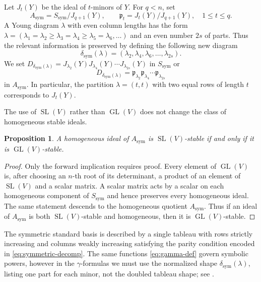 \documentclass[11pt,reqno]{amsart}
\numberwithin{equation}{subsection}
\newtheorem{proposition}[theorem]{Proposition}
\theoremstyle{definition}
\theoremstyle{remark}
\DeclareMathOperator{\GL}{GL}
\DeclareMathOperator{\SL}{SL}
\newcommand{\fp}{\mathfrak p}
\begin{document}
Let $J_t(Y)$ be the ideal of $t$-minors of $Y$.  For $q<n$, set
\begin{equation}\label{eq:symmetric-quotient}
 A_{\mathrm{sym}}=S_{\mathrm{sym}}/J_{q+1}(Y),
 \qquad
 \fp_t=J_t(Y)/J_{q+1}(Y),\quad1\le t\le q.
\end{equation}
A Young diagram $\lambda$ with even column lengths has the form $\lambda=(\lambda_1 = \lambda_2 \geq  \lambda_3= \lambda_4 \geq  \lambda_5= \lambda_6, \ldots)$ and an even number $2s$ of parts. Thus the relevant information is preserved by
defining the following new diagram
\begin{equation}\label{eq:sym-transform}
 \delta_{\mathrm{sym}}(\lambda)
 =(\lambda_2,\lambda_4,
 \lambda_6,\ldots, \lambda_{2s}).
\end{equation}
We set  $D_{\delta_{\mathrm{sym}}(\lambda)}=J_{\lambda_2}(Y)J_{\lambda_4}(Y)\cdots J_{\lambda_{2s}}(Y)$ in $S_{\mathrm{sym}}$ or 
\[
D_{\delta_{\mathrm{sym}}(\lambda)}=\fp_{\lambda_2}\fp_{\lambda_4}\cdots \fp_{\lambda_{2s}}
\] in $A_{\mathrm{sym}}$. 
In particular, the partition $\lambda=(t, t)$ with two equal rows of length $t$ corresponds to $J_t(Y)$.

The use of $\SL(V)$ rather than $\GL(V)$ does not change the class of
homogeneous stable ideals.

\begin{proposition}\label{prop:sl-gl}
A homogeneous ideal of $A_{\mathrm{sym}}$ is $\SL(V)$-stable if and
only if it is $\GL(V)$-stable.
\end{proposition}

\begin{proof}
Only the forward implication requires proof.  Every element of
$\GL(V)$ is, after choosing an $n$-th root of its determinant, a product
of an element of $\SL(V)$ and a scalar matrix.  A scalar matrix acts by
a scalar on each homogeneous component of $S_{\mathrm{sym}}$ and hence
preserves every homogeneous ideal.  The same statement descends to the
homogeneous quotient $A_{\mathrm{sym}}$. Thus if an ideal of $A_{\mathrm{sym}}$ is both $\SL(V)$-stable and homogeneous, then it is $\GL(V)$-stable.
\end{proof}

The symmetric standard basis is described by a single tableau with
rows strictly increasing and columns weakly increasing satisfying the parity condition encoded in \eqref{eq:symmetric-decomp}. 
The same
functions \eqref{eq:gamma-def} govern symbolic powers, however in the $\gamma$-formulas we must use the normalized shape
$\delta_{\mathrm{sym}}(\lambda)$, listing one part for each minor,
not the doubled tableau shape; see \cite[Section~2.4]{HenriquesVarbaro}.
\end{document}
